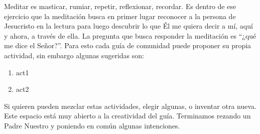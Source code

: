 Meditar es masticar, rumiar, repetir, reflexionar, recordar. Es dentro de ese ejercicio que la meditación busca en primer lugar reconocer a la persona de Jesucristo en la lectura para luego descubrir lo que Él me quiera decir a mí, aquí y ahora, a través de ella. La pregunta que busca responder la meditación es “¿qué me dice el Señor?”. Para esto cada guía de comunidad puede proponer su propia actividad, sin embargo algunas sugeridas son:

\begin{enumerate}
  \item act1
  \item act2
\end{enumerate}
    
Si quieren pueden mezclar estas actividades, elegir algunas, o inventar otra nueva. Este espacio está muy abierto a la creatividad del guía.  
Terminamos rezando un Padre Nuestro y poniendo en común algunas intenciones.